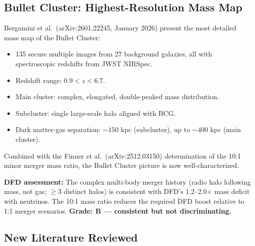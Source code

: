 \documentclass[11pt]{article}
\begin{document}
\subsection{Bullet Cluster: Highest-Resolution Mass Map}

Bergamini et al.\ (arXiv:2601.22245, January 2026) present the
most detailed mass map of the Bullet Cluster:
\begin{itemize}
  \item 135 secure multiple images from 27 background galaxies,
    all with spectroscopic redshifts from JWST NIRSpec.
  \item Redshift range: $0.9 < z < 6.7$.
  \item Main cluster: complex, elongated, double-peaked mass
    distribution.
  \item Subcluster: single large-scale halo aligned with BCG.
  \item Dark matter-gas separation: $\sim 150$ kpc (subcluster),
    up to $\sim 400$ kpc (main cluster).
\end{itemize}

Combined with the Finner et al.\ (arXiv:2512.03150) determination
of the 10:1 minor merger mass ratio, the Bullet Cluster picture is
now well-characterized.

\textbf{DFD assessment:} The complex multi-body merger history
(radio halo following mass, not gas; $\geq 3$ distinct halos)
is consistent with DFD's 1.2--2.0$\times$ mass deficit with
neutrinos. The 10:1 mass ratio reduces the required DFD boost
relative to 1:1 merger scenarios. \textbf{Grade: B --- consistent
but not discriminating.}

\subsection{New Literature Reviewed}
\end{document}
